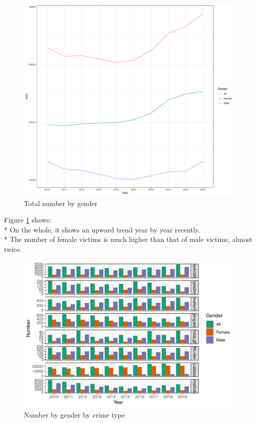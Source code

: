 \documentclass[11pt,a4paper,]{article}
\begin{document}
\begin{figure}
\centering
\includegraphics{report_files/figure-latex/gendertotal-1.pdf}
\caption{\label{fig:gendertotal}Total number by gender}
\end{figure}

Figure \ref{fig:gendertotal} shows:\\
* On the whole, it shows an upward trend year by year recently.\\
* The number of female victims is much higher than that of male victims, almost twice.

\begin{figure}
\centering
\includegraphics{report_files/figure-latex/gendertype-1.pdf}
\caption{\label{fig:gendertype}Number by gender by crime type}
\end{figure}
\end{document}
